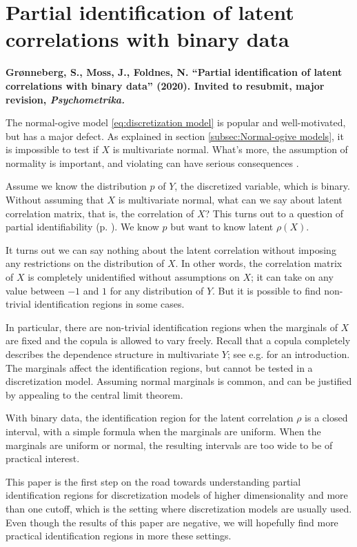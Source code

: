 \section{Partial identification of
latent correlations with binary data}
\textbf{Grønneberg, S., Moss, J., Foldnes, N. ``Partial identification of
latent correlations with binary data'' (2020). Invited to resubmit, major revision, \emph{Psychometrika.}}

The normal-ogive model \eqref{eq:discretization model} is popular and well-motivated, but has a major defect. As explained in section \ref{subsec:Normal-ogive models}, it is impossible to test if $X$ is multivariate normal. What's more, the assumption of normality is important, and violating can have serious consequences \parencite{Foldnes2019-ew}. 

Assume we know the distribution $p$ of $Y$, the discretized variable, which is binary. Without assuming that $X$ is multivariate normal, what can we say about latent correlation matrix, that is, the correlation of $X$? This turns out to a question of partial identifiability (p. \pageref{sec:partial identification}). We know $p$ but want to know latent $\rho(X)$.

It turns out we can say nothing about the latent correlation without imposing any restrictions on the distribution of $X$. In other words, the correlation matrix of $X$ is completely unidentified without assumptions on $X$; it can take on any value between $-1$ and $1$ for any distribution of $Y$. But it is possible to find non-trivial identification regions in some cases.

In particular, there are non-trivial identification regions when the marginals of $X$ are fixed and the copula is allowed to vary freely. Recall that a copula completely describes the dependence structure in multivariate $Y$; see e.g. \textcite{Nelsen2007-qj} for an introduction. The marginals affect the identification regions, but cannot be tested in a discretization model. Assuming normal marginals is common, and can be justified by appealing to the central limit theorem.

With binary data, the identification region for the latent correlation $\rho$ is a closed interval, with a simple formula when the marginals are uniform. When the marginals are uniform or normal, the resulting intervals are too wide to be of practical interest. 

This paper is the first step on the road towards understanding partial identification regions for discretization models of higher dimensionality and more than one cutoff, which is the setting where discretization models are usually used. Even though the results of this paper are negative, we will hopefully find more practical identification regions in more these settings.

